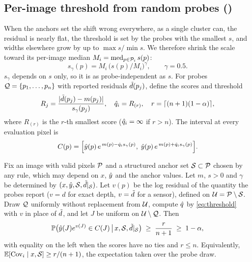 \subsection{Per-image threshold from random probes (\mDual)}
\label{sec:dual}
When the anchors set the shift wrong everywhere, as a single cluster can, the residual is nearly flat, the threshold is set by the probes with the smallest $s$, and widths elsewhere grow by up to $\max s/\min s$.
We therefore shrink the scale toward its per-image median $M_i=\operatorname{med}_{p\in\mathcal{P}_i}s(p)$:
\begin{equation}
s_\gamma(p)=M_i\,\big(s(p)/M_i\big)^{\gamma},\qquad \gamma=0.5 .
\label{eq:shrink}
\end{equation}
$s_\gamma$ depends on $s$ only, so it is as probe-independent as $s$.
For probes $\mathcal{Q}=\{p_1,\dots,p_n\}$ with reported residuals $\tilde{d}(p_j)$, define the scores and threshold
\begin{equation}
R_j=\frac{|\tilde{d}(p_j)-m(p_j)|}{s_\gamma(p_j)},\quad
\hat{q}_i=R_{(r)},\quad r=\lceil(n+1)(1-\alpha)\rceil,
\label{eq:threshold}
\end{equation}
where $R_{(r)}$ is the $r$-th smallest score ($\hat{q}_i=\infty$ if $r>n$).
The interval at every evaluation pixel is
\begin{equation}
C(p)=\Big[\hat{y}(p)\,e^{\,m(p)-\hat{q}_i s_\gamma(p)},\;\hat{y}(p)\,e^{\,m(p)+\hat{q}_i s_\gamma(p)}\Big].
\label{eq:interval}
\end{equation}

\begin{theorem}
\label{thm:dual}
Fix an image with valid pixels $\mathcal{P}$ and a structured anchor set $\mathcal{S}\subset\mathcal{P}$ chosen by any rule, which may depend on $x$, $\hat{y}$ and the anchor values.
Let $m$, $s>0$ and $\gamma$ be determined by $(x,\hat{y},\mathcal{S},\tilde{d}|_{\mathcal{S}})$.
Let $v(p)$ be the log residual of the quantity the probes report ($v=d$ for exact depth, $v=\tilde{d}$ for a sensor), defined on $\mathcal{U}=\mathcal{P}\setminus\mathcal{S}$.
Draw $\mathcal{Q}$ uniformly without replacement from $\mathcal{U}$, compute $\hat{q}$ by \cref{eq:threshold} with $v$ in place of $\tilde{d}$, and let $J$ be uniform on $\mathcal{U}\setminus\mathcal{Q}$.
Then
\begin{equation*}
\mathbb{P}\big(\hat{y}(J)e^{v(J)}\in C(J)\,\big|\,x,\mathcal{S},\tilde{d}|_{\mathcal{S}}\big)\;\ge\;\frac{r}{n+1}\;\ge\;1-\alpha,
\end{equation*}
with equality on the left when the scores have no ties and $r\le n$.
Equivalently, $\mathbb{E}[\mathrm{Cov}_i\mid x,\mathcal{S}]\ge r/(n+1)$, the expectation taken over the probe draw.
\end{theorem}

